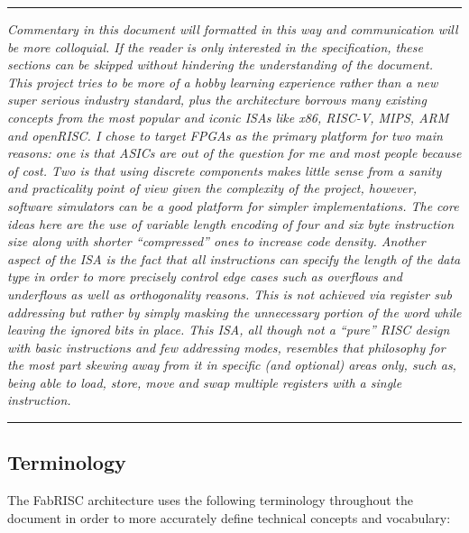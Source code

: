     \par\noindent\rule{\textwidth}{0.4pt}
    \textit{Commentary in this document will formatted in this way and communication will be more colloquial. If the reader is only interested in the specification, these sections can be skipped without hindering the understanding of the document. This project tries to be more of a hobby learning experience rather than a new super serious industry standard, plus the architecture borrows many existing concepts from the most popular and iconic ISAs like x86, RISC-V, MIPS, ARM and openRISC. I chose to target FPGAs as the primary platform for two main reasons: one is that ASICs are out of the question for me and most people because of cost. Two is that using discrete components makes little sense from a sanity and practicality point of view given the complexity of the project, however, software simulators can be a good platform for simpler implementations. The core ideas here are the use of variable length encoding of four and six byte instruction size along with shorter ``compressed'' ones to increase code density. Another aspect of the ISA is the fact that all instructions can specify the length of the data type in order to more precisely control edge cases such as overflows and underflows as well as orthogonality reasons. This is not achieved via register sub addressing but rather by simply masking the unnecessary portion of the word while leaving the ignored bits in place. This ISA, all though not a ``pure'' RISC design with basic instructions and few addressing modes, resembles that philosophy for the most part skewing away from it in specific (and optional) areas only, such as, being able to load, store, move and swap multiple registers with a single instruction.}
    \par\noindent\rule{\textwidth}{0.4pt}

    \subsection[Terminology]{Terminology}

        \vspace{10pt}

        The FabRISC architecture uses the following terminology throughout the document in order to more accurately define technical concepts and vocabulary:


